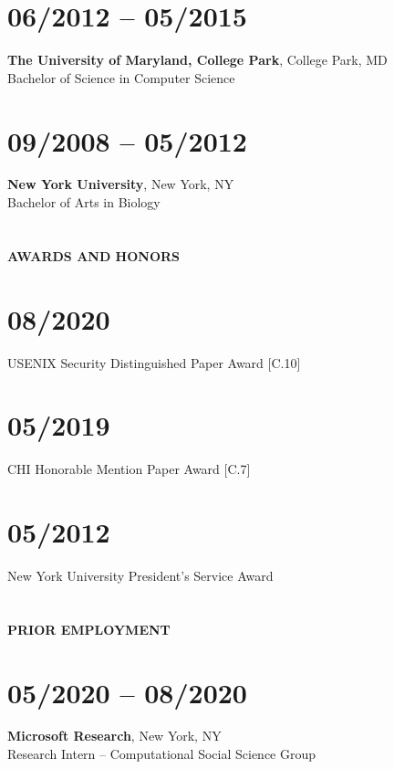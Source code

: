 \section{06/2012 -- 05/2015}

\textbf{The University of Maryland, College Park}, College Park, MD \\ Bachelor
of Science in Computer Science

\section{09/2008 -- 05/2012}

\textbf{New York University}, New York, NY \\
Bachelor of Arts in Biology

\section{} \vspace{0.1in} \textbf{AWARDS AND HONORS} \vspace{-0.05in}

\section{08/2020} USENIX Security Distinguished Paper Award [C.10]

\section{05/2019} CHI Honorable Mention Paper Award [C.7]

\section{05/2012} New York University President's Service Award


\section{} \vspace{0.1in} \textbf{PRIOR EMPLOYMENT} \vspace{-0.5em}

\section{05/2020 -- 08/2020}
\textbf{Microsoft Research}, New York, NY \\
Research Intern -- Computational Social Science Group


